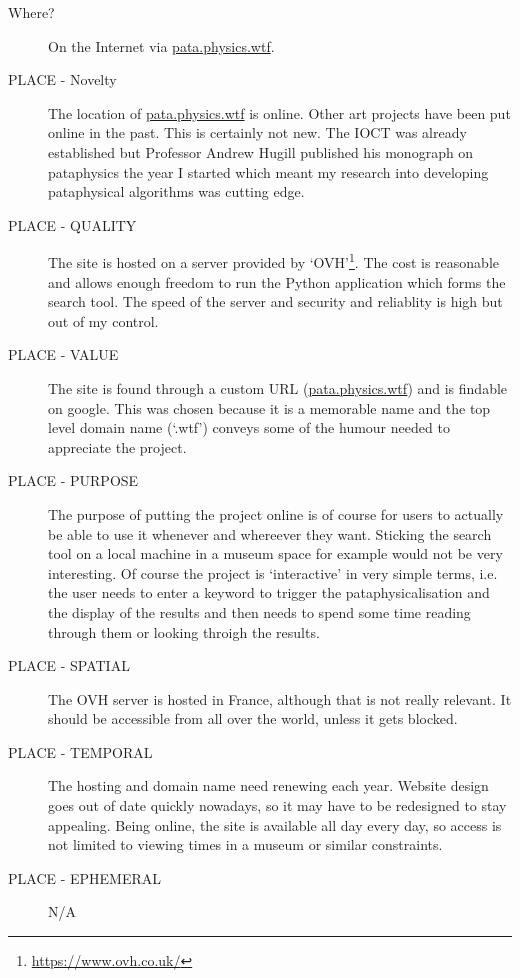 \begin{description}
  \item[Where?] On the Internet via \url{pata.physics.wtf}.
  \item[PLACE - Novelty] The location of \url{pata.physics.wtf} is online. Other art projects have been put online in the past. This is certainly not new. The \ac{IOCT} was already established but Professor Andrew Hugill published his monograph on pataphysics the year I started which meant my research into developing pataphysical algorithms was cutting edge.  
  \item[PLACE - QUALITY] The site is hosted on a server provided by `OVH'\footnote{\url{https://www.ovh.co.uk/}}. The cost is reasonable and allows enough freedom to run the Python application which forms the search tool. The speed of the server and security and reliablity is high but out of my control.
  \item[PLACE - VALUE] The site is found through a custom \ac{URL} (\url{pata.physics.wtf}) and is findable on google. This was chosen because it is a memorable name and the top level domain name (`.wtf') conveys some of the humour needed to appreciate the project.
  \item[PLACE - PURPOSE] The purpose of putting the project online is of course for users to actually be able to use it whenever and whereever they want. Sticking the search tool on a local machine in a museum space for example would not be very interesting. Of course the project is `interactive' in very simple terms, i.e. the user needs to enter a keyword to trigger the pataphysicalisation and the display of the results and then needs to spend some time reading through them or looking throigh the results.
  \item[PLACE - SPATIAL] The OVH server is hosted in France, although that is not really relevant. It should be accessible from all over the world, unless it gets blocked.
  \item[PLACE - TEMPORAL] The hosting and domain name need renewing each year. Website design goes out of date quickly nowadays, so it may have to be redesigned to stay appealing. Being online, the site is available all day every day, so access is not limited to viewing times in a museum or similar constraints.
  \item[PLACE - EPHEMERAL] N/A
\end{description}

\spirals

